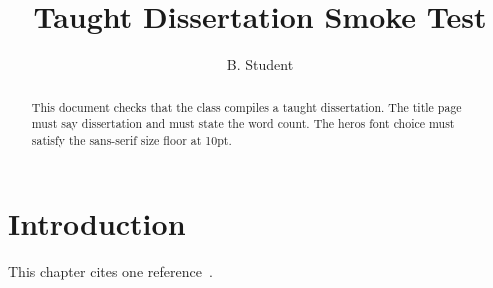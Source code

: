 \documentclass[msc,font=heros,10pt,a4paper]{bangorthesis}
\title{Taught Dissertation Smoke Test}
\author{B. Student}
\begin{document}
\maketitle
\statementspage
\begin{abstract}
  This document checks that the class compiles a taught dissertation.
  The title page must say dissertation and must state the word count.
  The heros font choice must satisfy the sans-serif size floor at 10pt.
\end{abstract}
\tables
\chapter{Introduction}
This chapter cites one reference~\autocite{knuth1984}.
\printbibliography
\end{document}
